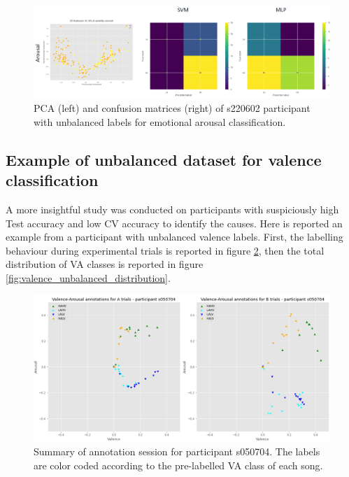 \begin{figure}[!htb]
\includegraphics[width=16cm]{img/appendix/arousal_unbalanced_pca_confusion.png}
\centering
\caption{PCA (left) and confusion matrices (right) of s220602 participant with unbalanced labels for emotional arousal 
classification.}\label{fig:arousal_unbalanced_pca_confusion}
\end{figure}
\FloatBarrier
\subsection{Example of unbalanced dataset for valence classification}
\label{sec:appendix_A3.3.2}
A more insightful study was conducted on participants with suspiciously high Test accuracy and low CV accuracy to identify the causes. Here is reported an example from a participant with unbalanced valence labels. First, the labelling behaviour during experimental trials is reported in figure \ref{fig:valence_unbalanced}, then the total distribution of \ac{VA} classes is reported in figure \ref{fig:valence_unbalanced_distribution}.

\begin{figure}[!htb]
\includegraphics[width=16cm]{img/appendix/valence_unbalanced.png}
\centering
\caption{Summary of annotation session for participant s050704. The labels are color coded according to the pre-labelled 
VA class of each song.}\label{fig:valence_unbalanced}
\end{figure}

